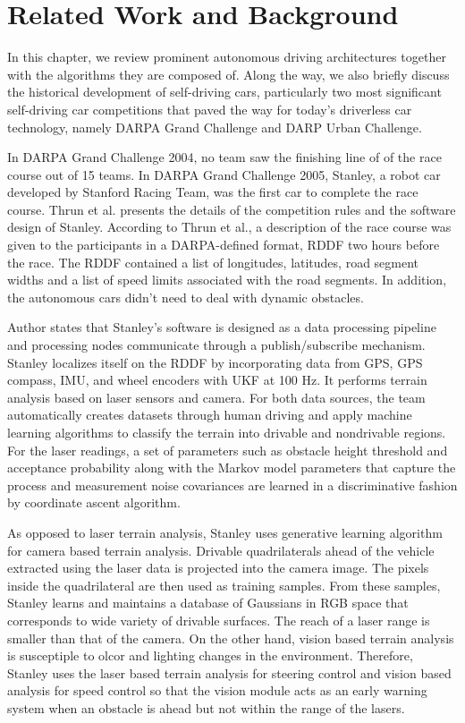 \chapter{Related Work and Background}
\label{chp:b2}

In this chapter, we review prominent autonomous driving architectures together
with the algorithms they are composed of. Along the way, we also briefly
discuss the historical development of self-driving cars, particularly two most
significant self-driving car competitions that paved the way for today's
driverless car technology, namely DARPA Grand Challenge and DARP Urban
Challenge.

In DARPA Grand Challenge 2004, no team saw the finishing line of of the race
course out of 15 teams. In DARPA Grand Challenge 2005, Stanley, a robot car
developed by Stanford Racing Team, was the first car to complete the race
course.  Thrun et al. \cite{Thrun2006StanleyTR} presents the details of the
competition rules and the software design of Stanley. According to Thrun et
al., a description of the race course was given to the participants in a
DARPA-defined format, RDDF two hours before the race. The RDDF contained a list
of longitudes, latitudes, road segment widths and a list of speed limits
associated with the road segments. In addition, the autonomous cars didn't need
to deal with dynamic obstacles.

Author states that Stanley's software is designed as a data processing pipeline
and processing nodes communicate through a publish/subscribe mechanism. Stanley
localizes itself on the RDDF by incorporating data from GPS, GPS compass, IMU,
and wheel encoders with UKF at 100 Hz. It performs terrain analysis based on
laser sensors and camera. For both data sources, the team automatically creates
datasets through human driving and apply machine learning algorithms to
classify the terrain into drivable and nondrivable regions. For the laser
readings, a set of parameters such as obstacle height threshold and acceptance
probability along with the Markov model parameters that capture the process and
measurement noise covariances are learned in a discriminative fashion by
coordinate ascent algorithm.

As opposed to laser terrain analysis, Stanley uses generative learning
algorithm for camera based terrain analysis. Drivable quadrilaterals ahead of
the vehicle extracted using the laser data is projected into the camera image.
The pixels inside the quadrilateral are then used as training samples. From
these samples, Stanley learns and maintains a database of Gaussians in RGB
space that corresponds to wide variety of drivable surfaces. The reach of a
laser range is smaller than that of the camera. On the other hand, vision based
terrain analysis is susceptiple to olcor and lighting changes in the
environment.  Therefore, Stanley uses the laser based terrain analysis for
steering control and vision based analysis for speed control so that the vision
module acts as an early warning system when an obstacle is ahead but not within
the range of the lasers.

